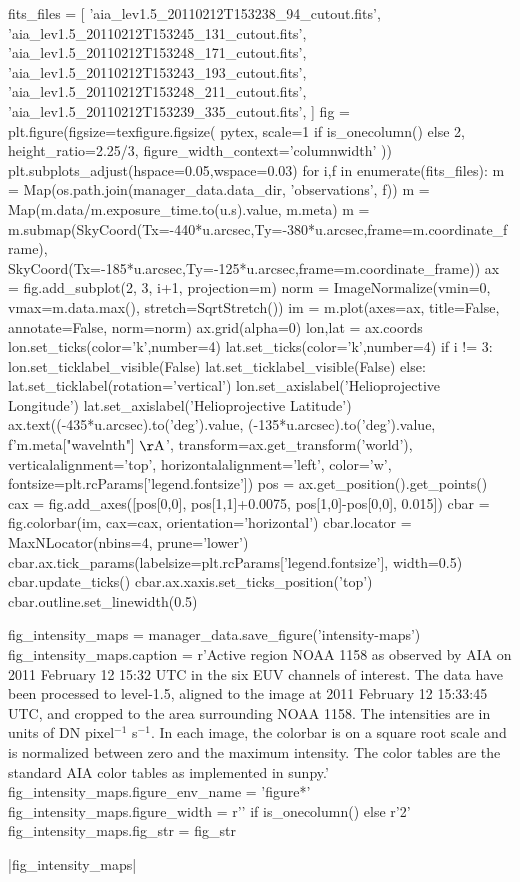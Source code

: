\begin{pycode}
fits_files = [
    'aia_lev1.5_20110212T153238_94_cutout.fits',
    'aia_lev1.5_20110212T153245_131_cutout.fits',
    'aia_lev1.5_20110212T153248_171_cutout.fits',
    'aia_lev1.5_20110212T153243_193_cutout.fits',
    'aia_lev1.5_20110212T153248_211_cutout.fits',
    'aia_lev1.5_20110212T153239_335_cutout.fits',
]
fig = plt.figure(figsize=texfigure.figsize(
    pytex,
    scale=1 if is_onecolumn() else 2,
    height_ratio=2.25/3,
    figure_width_context='columnwidth'
))
plt.subplots_adjust(hspace=0.05,wspace=0.03)
for i,f in enumerate(fits_files):
    m = Map(os.path.join(manager_data.data_dir, 'observations', f))
    m = Map(m.data/m.exposure_time.to(u.s).value, m.meta)
    m = m.submap(SkyCoord(Tx=-440*u.arcsec,Ty=-380*u.arcsec,frame=m.coordinate_frame),
                 SkyCoord(Tx=-185*u.arcsec,Ty=-125*u.arcsec,frame=m.coordinate_frame))
    ax = fig.add_subplot(2, 3, i+1, projection=m)
    norm = ImageNormalize(vmin=0, vmax=m.data.max(), stretch=SqrtStretch())
    im = m.plot(axes=ax, title=False, annotate=False, norm=norm)
    ax.grid(alpha=0)
    lon,lat = ax.coords
    lon.set_ticks(color='k',number=4)
    lat.set_ticks(color='k',number=4)
    if i != 3:
        lon.set_ticklabel_visible(False)
        lat.set_ticklabel_visible(False)
    else:
        lat.set_ticklabel(rotation='vertical')
        lon.set_axislabel('Helioprojective Longitude')
        lat.set_axislabel('Helioprojective Latitude')
    ax.text((-435*u.arcsec).to('deg').value,
            (-135*u.arcsec).to('deg').value,
            f'{m.meta["wavelnth"]} $\mathrm{{\AA}}$',
            transform=ax.get_transform('world'),
            verticalalignment='top',
            horizontalalignment='left',
            color='w',
            fontsize=plt.rcParams['legend.fontsize'])
    pos = ax.get_position().get_points()
    cax = fig.add_axes([pos[0,0], pos[1,1]+0.0075, pos[1,0]-pos[0,0], 0.015])
    cbar = fig.colorbar(im, cax=cax, orientation='horizontal')
    cbar.locator = MaxNLocator(nbins=4, prune='lower')
    cbar.ax.tick_params(labelsize=plt.rcParams['legend.fontsize'], width=0.5)
    cbar.update_ticks()
    cbar.ax.xaxis.set_ticks_position('top')
    cbar.outline.set_linewidth(0.5)

fig_intensity_maps = manager_data.save_figure('intensity-maps')
fig_intensity_maps.caption = r'Active region NOAA 1158 as observed by AIA on 2011 February 12 15:32 UTC in the six EUV channels of interest. The data have been processed to level-1.5, aligned to the image at 2011 February 12 15:33:45 UTC, and cropped to the area surrounding NOAA 1158. The intensities are in units of DN pixel$^{-1}$ s$^{-1}$. In each image, the colorbar is on a square root scale and is normalized between zero and the maximum intensity. The color tables are the standard AIA color tables as implemented in sunpy.'
fig_intensity_maps.figure_env_name = 'figure*'
fig_intensity_maps.figure_width = r'\columnwidth' if is_onecolumn() else r'2\columnwidth'
fig_intensity_maps.fig_str = fig_str
\end{pycode}
|fig_intensity_maps|

